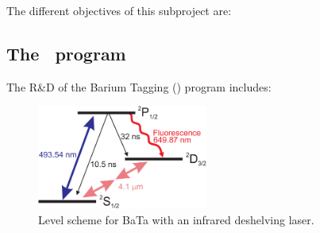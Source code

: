 \documentclass[a4paper,11pt,oneside]{article}
\begin{document}
The different objectives of this subproject are:


\subsection{The \BATA\ program}
The R\&D of the Barium Tagging (\BATA) program includes:

\begin{figure}
\centering
\includegraphics[width=0.5\textwidth]{img/levelscheme2.pdf}
\caption{\label{fig.levelscheme2} Level scheme for BaTa with an infrared deshelving laser.} 
\end{figure}
\end{document}
